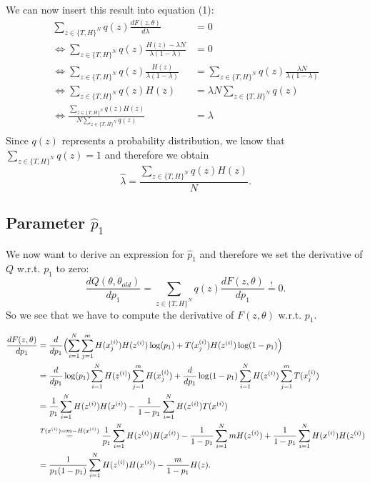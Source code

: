 \documentclass[10pt,a4paper]{article}
\begin{document}
We can now insert this result into equation (1):
\begin{align*}
\sum_{z\in \{T,H\}^N} q(z) \frac{dF(z,\theta)}{d\lambda} &=0\\
\Leftrightarrow \sum_{z\in \{T,H\}^N} q(z) \frac{H(z)-\lambda N}{\lambda(1-\lambda)} &=0\\
\Leftrightarrow \sum_{z\in \{T,H\}^N} q(z) \frac{H(z)}{\lambda(1-\lambda)} &= \sum_{z\in \{T,H\}^N} q(z) \frac{\lambda N}{\lambda(1-\lambda)}\\
\Leftrightarrow \sum_{z\in \{T,H\}^N} q(z) H(z) &= \lambda N \sum_{z\in \{T,H\}^N} q(z) \\
\Leftrightarrow \frac{\sum_{z\in \{T,H\}^N} q(z) H(z)}{N \sum_{z\in \{T,H\}^N} q(z)} &= \lambda\\
\end{align*}
Since $q(z)$ represents a probability distribution, we know that $\sum_{z\in \{T,H\}^N} q(z)=1$ and therefore we obtain
\begin{equation*}
\hat \lambda = \frac{\sum_{z\in \{T,H\}^N} q(z) H(z)}{N}.
\end{equation*}

\subsection*{Parameter $\hat p_1$}

We now want to derive an expression for $\hat p_1$ and therefore we set the derivative of $Q$ w.r.t. $p_1$ to zero:
\begin{equation}\label{derQp1}
\frac{dQ(\theta,\theta_{old})}{d p_1}=\sum_{z\in \{T,H\}^N} q(z) \frac{dF(z,\theta)}{d p_1} \stackrel{!}{=}0.
\end{equation}
So we see that we have to compute the derivative of $F(z,\theta)$ w.r.t. $p_1$.

\begin{align*}
\frac{dF(z,\theta)}{d p_1} &= \frac{d}{d p_1} \Bigl ( \sum_{i=1}^N \sum_{j=1}^m  H(x_j^{(i)}) H(z^{(i)}) \log(p_1) + T(x_j^{(i)}) H(z^{(i)})\log(1-p_1) \Bigr )\\
&= \frac{d}{d p_1} \log(p_1) \sum_{i=1}^N  H(z^{(i)})\sum_{j=1}^m  H(x_j^{(i)})  + \frac{d}{d p_1} \log(1-p_1) \sum_{i=1}^N H(z^{(i)}) \sum_{j=1}^m T(x_j^{(i)}) \\
&= \frac{1}{p_1} \sum_{i=1}^N  H(z^{(i)}) H(x^{(i)}) - \frac{1}{1-p_1} \sum_{i=1}^N H(z^{(i)}) T(x^{(i)}) \\
&\stackrel{T(x^{(i)})=m-H(x^{(i)})}{=} \frac{1}{p_1} \sum_{i=1}^N  H(z^{(i)}) H(x^{(i)}) - \frac{1}{1-p_1} \sum_{i=1}^N m H(z^{(i)}) + \frac{1}{1-p_1} \sum_{i=1}^N H(x^{(i)})H(z^{(i)}) \\
&=\frac{1}{p_1(1-p_1)} \sum_{i=1}^N  H(z^{(i)}) H(x^{(i)}) - \frac{m}{1-p_1} H(z).
\end{align*}
\end{document}
